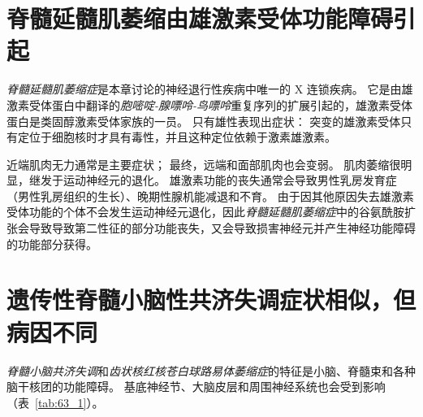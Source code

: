 \section{脊髓延髓肌萎缩由雄激素受体功能障碍引起}

\textit{脊髓延髓肌萎缩症}是本章讨论的神经退行性疾病中唯一的 X 连锁疾病。
它是由雄激素受体蛋白中翻译的\textit{胞嘧啶-腺嘌呤-鸟嘌呤}重复序列的扩展引起的，雄激素受体蛋白是类固醇激素受体家族的一员。
只有雄性表现出症状：
突变的雄激素受体只有定位于细胞核时才具有毒性，并且这种定位依赖于激素雄激素。


近端肌肉无力通常是主要症状；
最终，远端和面部肌肉也会变弱。
肌肉萎缩很明显，继发于运动神经元的退化。
雄激素功能的丧失通常会导致男性乳房发育症（男性乳房组织的生长）、晚期性腺机能减退和不育。
由于因其他原因失去雄激素受体功能的个体不会发生运动神经元退化，因此\textit{脊髓延髓肌萎缩症}中的谷氨酰胺扩张会导致导致第二性征的部分功能丧失，又会导致损害神经元并产生神经功能障碍的功能部分获得。



\section{遗传性脊髓小脑性共济失调症状相似，但病因不同}

\textit{脊髓小脑共济失调}和\textit{齿状核红核苍白球路易体萎缩症}的特征是小脑、脊髓束和各种脑干核团的功能障碍。
基底神经节、大脑皮层和周围神经系统也会受到影响（表~\ref{tab:63_1}）。


